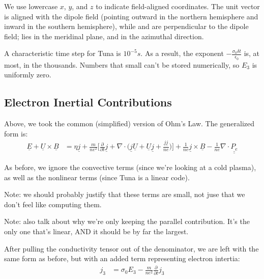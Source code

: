 We use lowercase $x$, $y$, and $z$ to indicate field-aligned coordinates. The
unit vector \zhat is aligned with the dipole field (pointing outward in the
northern hemisphere and inward in the southern hemisphere), while \xhat and
\yhat are perpendicular to the dipole field; \xhat lies in the meridinal plane,
and \yhat in the azimuthal direction.

A characteristic time step for Tuna is $10^{-5} s$. As a result, the exponent $- \frac{\sigma_0 \delta t}{\epsilon_0}$ is, at most, in the thousands. Numbers that small can't be stored numerically, so $E_3$ is uniformly zero. 

\subsection{Electron Inertial Contributions}

Above, we took the common (simplified) version of Ohm's Law. The generalized form is:
\begin{align}
  \underline{E} +
  \underline{U} \times \underline{B} & = 
  \eta \underline{j} +
  \frac{m}{n e^2} \Big[
    \frac{\partial}{\partial t} \underline{j} +
    \nabla \cdot \big( \underline{j} \underline{U} +
    \underline{U} \underline{j} +
    \frac{ \underline{j} \underline{j} }{n e} \big) 
  \Big] +
  \frac{1}{n e} \underline{j} \times \underline{B} -
  \frac{1}{n e} \nabla \cdot \underline{ \underline{P_e} }
\end{align}

As before, we ignore the convective terms (since we're looking at a cold plasma), as well as the nonlinear terms (since Tuna is a linear code). 

Note: we should probably justify that these terms are small, not juse that we don't feel like computing them. 

Note: also talk about why we're only keeping the parallel contribution. It's the only one that's linear, AND it should be by far the largest. 

After pulling the conductivity tensor out of the denominator, we are left with the same form as before, but with an added term representing electron intertia:
\begin{align}
  j_3 & =
  \sigma_0 E_3 -
  \frac{m}{n e^2} \frac{\partial}{\partial t} j_3
\end{align}


